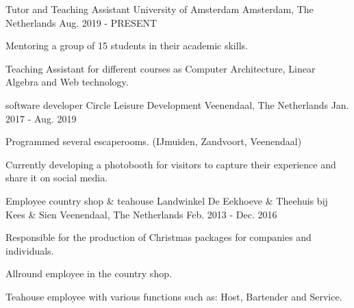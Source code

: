 


\begin{cventries}


\cventry
{Tutor and Teaching Assistant} %
{University of Amsterdam} %
{Amsterdam, The Netherlands} %
{Aug. 2019 - PRESENT} %
{ %
\begin{cvitems}
\item {Mentoring a group of 15 students in their academic skills.}
\item {Teaching Assistant for different courses as Computer Architecture, Linear Algebra and Web technology.}
\end{cvitems}
}

\cventry
{software developer} %
{Circle Leisure Development} %
{Veenendaal, The Netherlands} %
{Jan. 2017 - Aug. 2019} %
{ %
\begin{cvitems}
\item {Programmed several escaperooms. (IJmuiden, Zandvoort, Veenendaal)}
\item {Currently developing a photobooth for visitors to capture their experience and share it on social media.}
\end{cvitems}
}


\cventry
{Employee country shop \& teahouse} %
{Landwinkel De Eekhoeve \& Theehuis bij Kees \& Sien} %
{Veenendaal, The Netherlands} %
{Feb. 2013 - Dec. 2016} %
{ %
\begin{cvitems}
\item {Responsible for the production of Christmas packages for companies and individuals.}
\item {Allround employee in the country shop.}
\item {Teahouse employee with various functions such as: Host, Bartender and Service.}
\end{cvitems}
}


\end{cventries}
